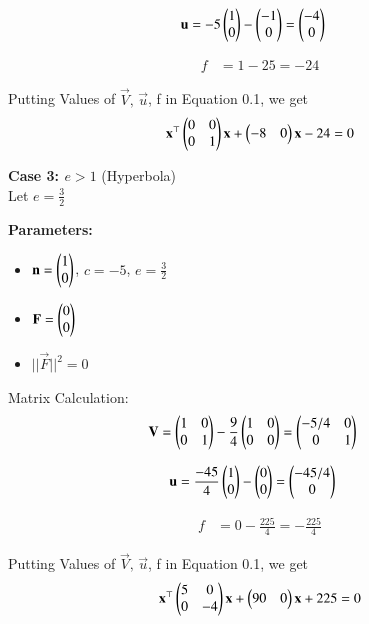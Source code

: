 \documentclass[journal]{IEEEtran}
\begin{document}
\begin{align}
\mathbf{u} &= -5\begin{pmatrix}1 \\ 0\end{pmatrix} - \begin{pmatrix}-1 \\ 0\end{pmatrix} = \begin{pmatrix}-4 \\ 0\end{pmatrix}
\end{align}

\begin{align}
f &= 1 - 25 = -24
\end{align}

Putting Values of $\vec{V}, \, \vec{u}$, f in Equation 0.1, we get
\begin{equation}
\mathbf{x}^\top\begin{pmatrix}0 & 0 \\ 0 & 1\end{pmatrix}\mathbf{x} + \begin{pmatrix}-8 & 0\end{pmatrix}\mathbf{x} - 24 = 0
\end{equation}


\newpage

\textbf{Case 3: $e > 1$} (Hyperbola)\\
Let $e = \frac{3}{2}$

\textbf{Parameters:}
\begin{itemize}
\item $\mathbf{n} = \begin{pmatrix}1 \\ 0\end{pmatrix}$, $c = -5$, $e = \frac{3}{2}$
\item $\mathbf{F} = \begin{pmatrix}0 \\ 0\end{pmatrix}$
\item $||\vec{F}||^2 = 0$
\end{itemize}

\bigskip

Matrix Calculation:
\begin{align}
\mathbf{V} &= \begin{pmatrix}1 & 0 \\ 0 & 1\end{pmatrix} - \frac{9}{4}\begin{pmatrix}1 & 0 \\ 0 & 0\end{pmatrix} = \begin{pmatrix}-5/4 & 0 \\ 0 & 1\end{pmatrix}
\end{align}

\begin{align}
\mathbf{u} &= \frac{-45}{4}\begin{pmatrix}1 \\ 0\end{pmatrix} - \begin{pmatrix}0 \\ 0\end{pmatrix} = \begin{pmatrix}-45/4 \\ 0\end{pmatrix}
\end{align}

\begin{align}
f &= 0 - \frac{225}{4} = -\frac{225}{4}
\end{align}

Putting Values of $\vec{V}, \, \vec{u}$, f in Equation 0.1, we get
\begin{equation}
\mathbf{x}^\top\begin{pmatrix}5 & 0 \\ 0 & -4\end{pmatrix}\mathbf{x} + \begin{pmatrix}90 & 0\end{pmatrix}\mathbf{x} + 225 = 0
\end{equation}
\end{document}

